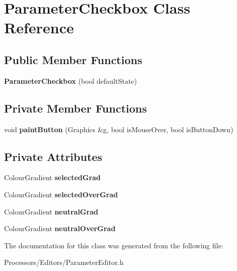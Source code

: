 \hypertarget{classParameterCheckbox}{\section{Parameter\-Checkbox Class Reference}
\label{classParameterCheckbox}
}
\subsection*{Public Member Functions}
\begin{DoxyCompactItemize}
\item 
\hypertarget{classParameterCheckbox_a0cbf41733b9adf5c052a6191471a3bf1}{{\bfseries Parameter\-Checkbox} (bool default\-State)}\label{classParameterCheckbox_a0cbf41733b9adf5c052a6191471a3bf1}

\end{DoxyCompactItemize}
\subsection*{Private Member Functions}
\begin{DoxyCompactItemize}
\item 
\hypertarget{classParameterCheckbox_a5c4f3c9168930acba05420d73eef27d7}{void {\bfseries paint\-Button} (Graphics \&g, bool is\-Mouse\-Over, bool is\-Button\-Down)}\label{classParameterCheckbox_a5c4f3c9168930acba05420d73eef27d7}

\end{DoxyCompactItemize}
\subsection*{Private Attributes}
\begin{DoxyCompactItemize}
\item 
\hypertarget{classParameterCheckbox_ac5c3d91e3a6d989d5221f47c36174823}{Colour\-Gradient {\bfseries selected\-Grad}}\label{classParameterCheckbox_ac5c3d91e3a6d989d5221f47c36174823}

\item 
\hypertarget{classParameterCheckbox_a3176afbf0afc9747b3a8eae6d03515e7}{Colour\-Gradient {\bfseries selected\-Over\-Grad}}\label{classParameterCheckbox_a3176afbf0afc9747b3a8eae6d03515e7}

\item 
\hypertarget{classParameterCheckbox_a0a1063e260bee5d2cb5e930c498768f7}{Colour\-Gradient {\bfseries neutral\-Grad}}\label{classParameterCheckbox_a0a1063e260bee5d2cb5e930c498768f7}

\item 
\hypertarget{classParameterCheckbox_a38234e37e544e473f48c3e540db1de8f}{Colour\-Gradient {\bfseries neutral\-Over\-Grad}}\label{classParameterCheckbox_a38234e37e544e473f48c3e540db1de8f}

\end{DoxyCompactItemize}


The documentation for this class was generated from the following file\-:\begin{DoxyCompactItemize}
\item 
Processors/\-Editors/Parameter\-Editor.\-h\end{DoxyCompactItemize}
